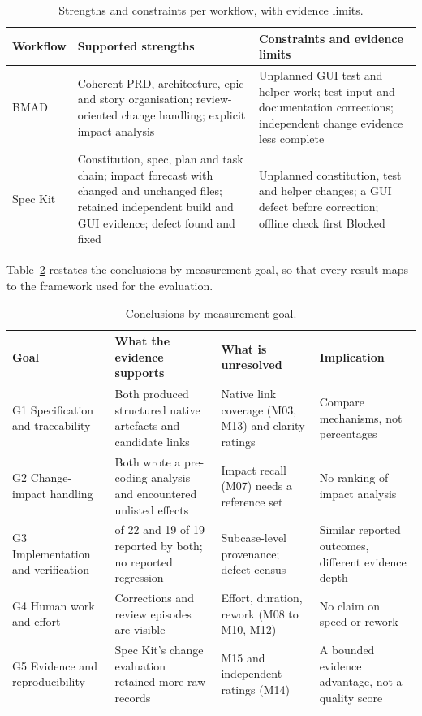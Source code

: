 \documentclass[conference]{IEEEtran}
\begin{document}
\begin{table}[htbp]
\caption{Strengths and constraints per workflow, with evidence limits.}\label{tbl-strength}
\centering\footnotesize\setlength{\tabcolsep}{3pt}
\begin{tabular}{>{\raggedright\arraybackslash}p{} >{\raggedright\arraybackslash}p{} >{\raggedright\arraybackslash}p{}}
\hline
\textbf{Workflow} & \textbf{Supported strengths} & \textbf{Constraints and evidence limits} \\
\hline
BMAD & Coherent PRD, architecture, epic and story organisation; review-oriented change handling; explicit impact analysis & Unplanned GUI test and helper work; test-input and documentation corrections; independent change evidence less complete \\
Spec Kit & Constitution, spec, plan and task chain; impact forecast with changed and unchanged files; retained independent build and GUI evidence; defect found and fixed & Unplanned constitution, test and helper changes; a GUI defect before correction; offline check first Blocked \\
\hline
\end{tabular}
\end{table}

Table~\ref{tbl-goals} restates the conclusions by measurement
goal, so that every result maps to the framework used for the
evaluation.

\begin{table}[htbp]
\caption{Conclusions by measurement goal.}\label{tbl-goals}
\centering\footnotesize\setlength{\tabcolsep}{3pt}
\begin{tabular}{>{\raggedright\arraybackslash}p{} >{\raggedright\arraybackslash}p{} >{\raggedright\arraybackslash}p{} >{\raggedright\arraybackslash}p{}}
\hline
\textbf{Goal} & \textbf{What the evidence supports} & \textbf{What is unresolved} & \textbf{Implication} \\
\hline
G1 Specification and traceability & Both produced structured native artefacts and candidate links & Native link coverage (M03, M13) and clarity ratings & Compare mechanisms, not percentages \\
G2 Change-impact handling & Both wrote a pre-coding analysis and encountered unlisted effects & Impact recall (M07) needs a reference set & No ranking of impact analysis \\
G3 Implementation and verification & 22 of 22 and 19 of 19 reported by both; no reported regression & Subcase-level provenance; defect census & Similar reported outcomes, different evidence depth \\
G4 Human work and effort & Corrections and review episodes are visible & Effort, duration, rework (M08 to M10, M12) & No claim on speed or rework \\
G5 Evidence and reproducibility & Spec Kit's change evaluation retained more raw records & M15 and independent ratings (M14) & A bounded evidence advantage, not a quality score \\
\hline
\end{tabular}
\end{table}
\end{document}

